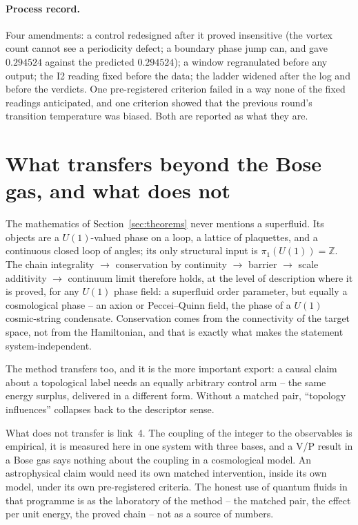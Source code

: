 \documentclass[11pt,a4paper]{article}
\begin{document}
\paragraph{Process record.} Four amendments: a control redesigned after it proved insensitive (the
vortex count cannot see a periodicity defect; a boundary phase jump can, and gave $0.294524$ against
the predicted $0.294524$); a window regranulated before any output; the I2 reading fixed before the
data; the ladder widened after the log and before the verdicts. One pre-registered criterion failed
in a way none of the fixed readings anticipated, and one criterion showed that the previous round's
transition temperature was biased. Both are reported as what they are.

\section{What transfers beyond the Bose gas, and what does not}\label{sec:transfer}

The mathematics of Section~\ref{sec:theorems} never mentions a superfluid. Its objects are a
$U(1)$-valued phase on a loop, a lattice of plaquettes, and a continuous closed loop of angles; its
only structural input is $\pi_1(U(1))=\mathbb Z$. The chain integrality $\to$ conservation by
continuity $\to$ barrier $\to$ scale additivity $\to$ continuum limit therefore holds, at the level of
description where it is proved, for any $U(1)$ phase field: a superfluid order parameter, but equally
a cosmological phase -- an axion or Peccei--Quinn field, the phase of a $U(1)$ cosmic-string
condensate. Conservation comes from the connectivity of the target space, not from the Hamiltonian,
and that is exactly what makes the statement system-independent.

The method transfers too, and it is the more important export: a causal claim about a topological
label needs an equally arbitrary control arm -- the same energy surplus, delivered in a different
form. Without a matched pair, ``topology influences'' collapses back to the descriptor sense.

What does not transfer is link~4. The coupling of the integer to the observables is empirical, it is
measured here in one system with three bases, and a V/P result in a Bose gas says nothing about the
coupling in a cosmological model. An astrophysical claim would need its own matched intervention,
inside its own model, under its own pre-registered criteria. The honest use of quantum fluids in that
programme is as the laboratory of the method -- the matched pair, the effect per unit energy, the
proved chain -- not as a source of numbers.
\end{document}
